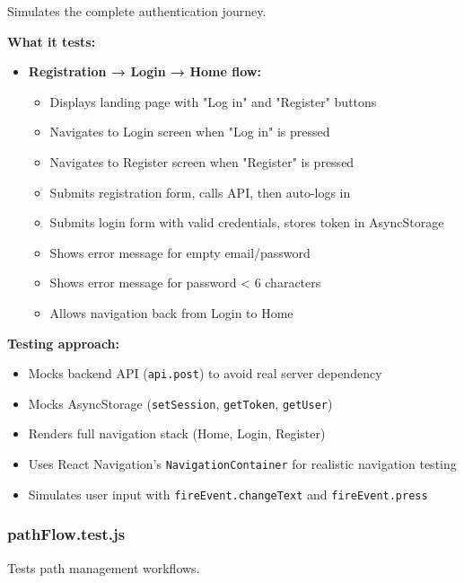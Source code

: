 Simulates the complete authentication journey.

\textbf{What it tests:}
\begin{itemize}
    \item \textbf{Registration → Login → Home flow:}
    \begin{itemize}
        \item Displays landing page with "Log in" and "Register" buttons
        \item Navigates to Login screen when "Log in" is pressed
        \item Navigates to Register screen when "Register" is pressed
        \item Submits registration form, calls API, then auto-logs in
        \item Submits login form with valid credentials, stores token in AsyncStorage
        \item Shows error message for empty email/password
        \item Shows error message for password < 6 characters
        \item Allows navigation back from Login to Home
    \end{itemize}
\end{itemize}

\textbf{Testing approach:}
\begin{itemize}
    \item Mocks backend API (\texttt{api.post}) to avoid real server dependency
    \item Mocks AsyncStorage (\texttt{setSession}, \texttt{getToken}, \texttt{getUser})
    \item Renders full navigation stack (Home, Login, Register)
    \item Uses React Navigation's \texttt{NavigationContainer} for realistic navigation testing
    \item Simulates user input with \texttt{fireEvent.changeText} and \texttt{fireEvent.press}
\end{itemize}

\subsubsection{pathFlow.test.js}
\label{subsubsec:path_flow_test}

Tests path management workflows.


